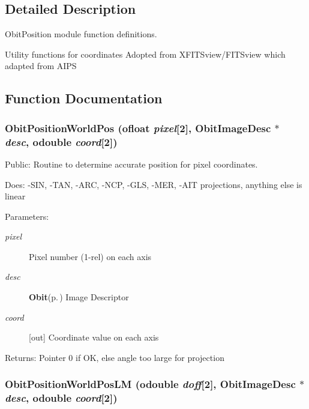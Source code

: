 \subsection{Detailed Description}
Obit\-Position module function definitions. 

Utility functions for coordinates Adopted from XFITSview/FITSview which adapted from AIPS

\subsection{Function Documentation}
\subsubsection{ Obit\-Position\-World\-Pos ({\bf ofloat} {\em pixel}[2], {\bf Obit\-Image\-Desc} $\ast$ {\em desc}, {\bf odouble} {\em coord}[2])}\label{ObitPosition_8c_a0}


Public: Routine to determine accurate position for pixel coordinates. 

Does: -SIN, -TAN, -ARC, -NCP, -GLS, -MER, -AIT projections, anything else is linear

\begin{Desc}
\item[Parameters:]
\begin{description}
\item[{\em pixel}]Pixel number (1-rel) on each axis \item[{\em desc}]{\bf Obit}{\rm (p.\,\pageref{structObit})} Image Descriptor \item[{\em coord}][out] Coordinate value on each axis \end{description}
\end{Desc}
\begin{Desc}
\item[Returns:]Pointer 0 if OK, else angle too large for projection \end{Desc}
\subsubsection{ Obit\-Position\-World\-Pos\-LM ({\bf odouble} {\em doff}[2], {\bf Obit\-Image\-Desc} $\ast$ {\em desc}, {\bf odouble} {\em coord}[2])}\label{ObitPosition_8c_a1}


